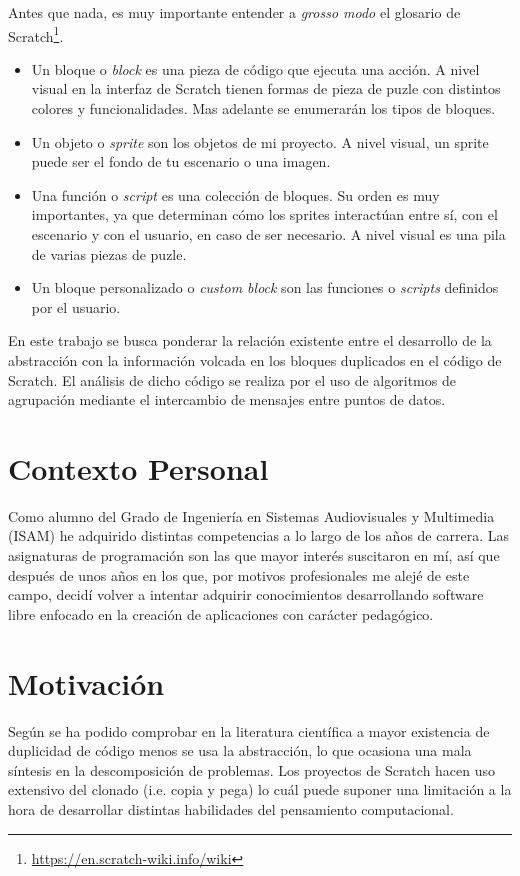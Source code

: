 \documentclass[a4paper, 12pt]{book}
\begin{document}
Antes que nada, es muy importante entender a \textit{grosso modo} el glosario de Scratch\footnote{\url{https://en.scratch-wiki.info/wiki}}. 
\begin{itemize}
 \item Un bloque o \textit{block} es una pieza de código que ejecuta una acción. A nivel visual en la interfaz de Scratch tienen formas de pieza de puzle con distintos colores y funcionalidades. Mas adelante se enumerarán los tipos de bloques.
 \item Un objeto o \textit{sprite} son los objetos de mi proyecto. A nivel visual, un sprite puede ser el fondo de tu escenario o una imagen.
 \item Una función o \textit{script} es una colección de bloques. Su orden es muy importantes, ya que determinan cómo los sprites interactúan entre sí, con el escenario y con el usuario, en caso de ser necesario. A nivel visual es una pila de varias piezas de puzle.
 \item Un bloque personalizado o \textit{custom block} son las funciones o \textit{scripts} definidos por el usuario.
\end{itemize}

En este trabajo se busca ponderar la relación existente entre el desarrollo de la abstracción con la información volcada en los bloques duplicados en el código de Scratch. El análisis de dicho código se realiza por el uso de algoritmos de agrupación mediante el intercambio de mensajes entre puntos de datos. \cite{clusteringpaper}

\section{Contexto Personal}
\label{sec:contexto}

Como alumno del Grado de Ingeniería en Sistemas Audiovisuales y Multimedia (ISAM) he adquirido distintas competencias a lo largo de los años de carrera. Las asignaturas de programación son las que mayor interés suscitaron en mí, así que después de unos años en los que, por motivos profesionales me alejé de este campo, decidí volver a intentar adquirir conocimientos desarrollando software libre enfocado en la creación de aplicaciones con carácter pedagógico.

\section{Motivación}
\label{sec:motivacion}

Según se ha podido comprobar en la literatura científica \cite{baxter_yahin} a mayor existencia de duplicidad de código menos se usa la abstracción, lo que ocasiona una mala síntesis en la descomposición de problemas.  Los proyectos de Scratch hacen uso extensivo del clonado (i.e. copia y pega) lo cuál puede suponer una limitación a la hora de desarrollar distintas habilidades del pensamiento computacional.
\end{document}
